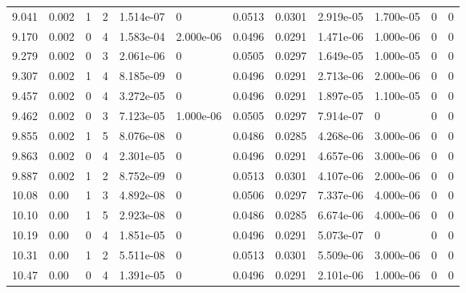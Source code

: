 \documentclass[preview]{standalone}
\begin{document}
{{{\begin{tabular}{L{1.2cm}C{1.2cm} C{0.3cm}C{0.5cm} C{1.4cm}C{1.4cm} C{1.4cm}C{1.4cm} C{1.6cm}C{1.6cm} C{1.6cm}C{1.6cm}}
  9.041  &  0.002  & 1     &  2 &  1.514e-07  & 0  &  0.0513&   0.0301& 2.919e-05 & 1.700e-05   &  0 & 0  \\ 
  9.170  &  0.002  & 0     &  4 &  1.583e-04  & 2.000e-06  &  0.0496&   0.0291& 1.471e-06 & 1.000e-06   &  0 & 0  \\ 
  9.279  &  0.002  & 0     &  3 &  2.061e-06  & 0  &  0.0505&   0.0297& 1.649e-05 & 1.000e-05   &  0 & 0  \\ 
  9.307  &  0.002  & 1     &  4 &  8.185e-09  & 0  &  0.0496&   0.0291& 2.713e-06 & 2.000e-06   &  0 & 0  \\ 
  9.457  &  0.002  & 0     &  4 &  3.272e-05  & 0  &  0.0496&   0.0291& 1.897e-05 & 1.100e-05   &  0 & 0  \\ 
  9.462  &  0.002  & 0     &  3 &  7.123e-05  & 1.000e-06  &  0.0505&   0.0297& 7.914e-07 & 0   &  0 & 0  \\ 
  9.855  &  0.002  & 1     &  5 &  8.076e-08  & 0  &  0.0486&   0.0285& 4.268e-06 & 3.000e-06   &  0 & 0  \\ 
  9.863  &  0.002  & 0     &  4 &  2.301e-05  & 0  &  0.0496&   0.0291& 4.657e-06 & 3.000e-06   &  0 & 0  \\ 
  9.887  &  0.002  & 1     &  2 &  8.752e-09  & 0  &  0.0513&   0.0301& 4.107e-06 & 2.000e-06   &  0 & 0  \\ 
  10.08  &  0.00  & 1     &  3 &  4.892e-08  & 0  &  0.0506&   0.0297& 7.337e-06 & 4.000e-06   &  0 & 0  \\ 
  10.10  &  0.00  & 1     &  5 &  2.923e-08  & 0  &  0.0486&   0.0285& 6.674e-06 & 4.000e-06   &  0 & 0  \\ 
  10.19  &  0.00  & 0     &  4 &  1.851e-05  & 0  &  0.0496&   0.0291& 5.073e-07 & 0   &  0 & 0  \\ 
  10.31  &  0.00  & 1     &  2 &  5.511e-08  & 0  &  0.0513&   0.0301& 5.509e-06 & 3.000e-06   &  0 & 0  \\ 
  10.47  &  0.00  & 0     &  4 &  1.391e-05  & 0  &  0.0496&   0.0291& 2.101e-06 & 1.000e-06   &  0 & 0  \\ 
\hline 
\end{tabular} 

}}}
\end{document}
